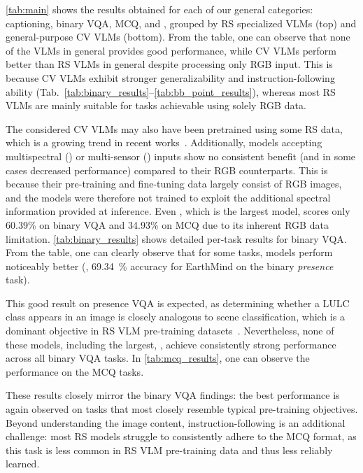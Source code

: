 \cref{tab:main} shows the results obtained for each of our general categories: captioning, binary \ac{VQA}, \ac{MCQ}, and \genDet{}, grouped by \ac{RS} specialized \acp{VLM} (top) and general-purpose \ac{CV} \acp{VLM} (bottom).
From the table, one can observe that none of the \acp{VLM} in general provides good performance, while \ac{CV} \acp{VLM} perform better than \ac{RS} \acp{VLM} in general despite processing only \ac{RGB} input.
This is because \ac{CV} \acp{VLM} exhibit stronger generalizability and instruction-following ability (Tab.~\ref{tab:binary_results}--\ref{tab:bb_point_results}), whereas most \ac{RS} \acp{VLM} are mainly suitable for tasks achievable using solely \ac{RGB} data.

The considered \ac{CV} \acp{VLM} may also have been pretrained using some \ac{RS} data, which is a growing trend in recent works~\cite{simeoni2025dinov3}.
Additionally, models accepting multispectral (\earthdialmsABBRns) or multi-sensor (\earthmindsarmsABBRns) inputs show no consistent benefit (and in some cases decreased performance) compared to their \ac{RGB} counterparts.
This is because their pre-training and fine-tuning data largely consist of \ac{RGB} images, and the models were therefore not trained to exploit the additional spectral information provided at inference.
Even \gptABBR{}, which is the largest model, scores only 60.39\% on binary \ac{VQA} and 34.93\% on \ac{MCQ} due to its inherent \ac{RGB} data limitation.
\cref{tab:binary_results} shows detailed per-task results for binary \ac{VQA}.
From the table, one can clearly observe that for some tasks, models perform noticeably better (\eg, \SI{69.34}{\percent} accuracy for EarthMind on the binary \emph{presence} task).

This good result on presence \ac{VQA} is expected, as determining whether a \ac{LULC} class appears in an image is closely analogous to scene classification, which is a dominant objective in \ac{RS} \ac{VLM} pre-training datasets~\cite{kuckreja2024geochat, muhtar2024lhrs, zhan2025skyeyegpt, soni2025earthdial, shu2025earthmind, hu2025rsgpt}.
Nevertheless, none of these models, including the largest, \gptABBRns, achieve consistently strong performance across all binary \ac{VQA} tasks.
In \cref{tab:mcq_results}, one can observe the performance on the \ac{MCQ} tasks.

These results closely mirror the binary \ac{VQA} findings: the best performance is again observed on tasks that most closely resemble typical pre-training objectives.
Beyond understanding the image content, instruction-following is an additional challenge: most \ac{RS} models struggle to consistently adhere to the \ac{MCQ} format, as this task is less common in \ac{RS} \ac{VLM} pre-training data and thus less reliably learned.
